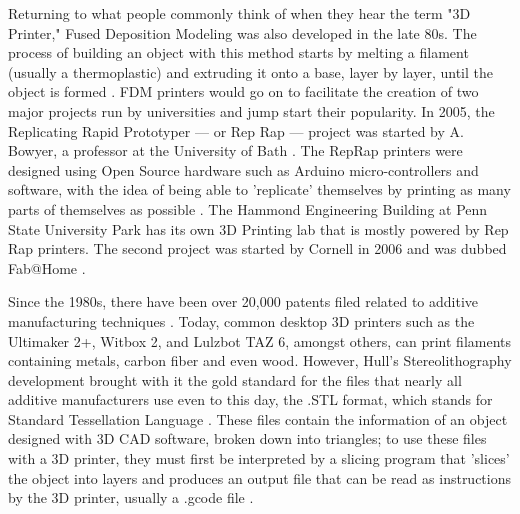 		Returning to what people commonly think of when they hear the term "3D Printer," Fused Deposition Modeling was also developed in the late 80s. The process of building an object with this method starts by melting a filament (usually a thermoplastic) and extruding it onto a base, layer by layer, until the object is formed \citep{Savini2015}. FDM printers would go on to facilitate the creation of two major projects run by universities and jump start their popularity. In 2005, the Replicating Rapid Prototyper --- or Rep Rap --- project was started by A. Bowyer, a professor at the University of Bath \citep{Savini2015}. The RepRap printers were designed using Open Source hardware such as Arduino micro-controllers and software, with the idea of being able to 'replicate' themselves by printing as many parts of themselves as possible \citep{Savini2015}. The Hammond Engineering Building at Penn State University Park has its own 3D Printing lab that is mostly powered by Rep Rap printers. The second project was started by Cornell in 2006 and was dubbed Fab@Home \citep{Savini2015}.\par
		Since the 1980s, there have been over 20,000 patents filed related to additive manufacturing techniques \citep{Savini2015}. Today, common desktop 3D printers such as the Ultimaker 2+, Witbox 2, and Lulzbot TAZ 6, amongst others, can print filaments containing metals, carbon fiber and even wood. However, Hull's Stereolithography development brought with it the gold standard for the files that nearly all additive manufacturers use even to this day, the .STL format, which stands for Standard Tessellation Language \citep{Gross2014}. These files contain the information of an object designed with 3D CAD software, broken down into triangles; to use these files with a 3D printer, they must first be interpreted by a slicing program that 'slices' the object into layers and produces an output file that can be read as instructions by the 3D printer, usually a .gcode file \citep{Savini2015, Gross2014}.

